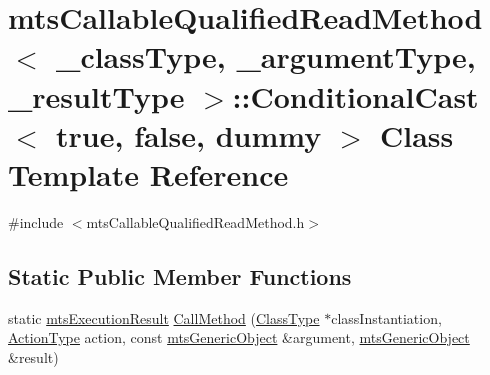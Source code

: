 \hypertarget{classmts_callable_qualified_read_method_1_1_conditional_cast_3_01true_00_01false_00_01dummy_01_4}{\section{mts\-Callable\-Qualified\-Read\-Method$<$ \-\_\-class\-Type, \-\_\-argument\-Type, \-\_\-result\-Type $>$\-:\-:Conditional\-Cast$<$ true, false, dummy $>$ Class Template Reference}
\label{classmts_callable_qualified_read_method_1_1_conditional_cast_3_01true_00_01false_00_01dummy_01_4}
}


{\ttfamily \#include $<$mts\-Callable\-Qualified\-Read\-Method.\-h$>$}

\subsection*{Static Public Member Functions}
\begin{DoxyCompactItemize}
\item 
static \hyperlink{classmts_execution_result}{mts\-Execution\-Result} \hyperlink{classmts_callable_qualified_read_method_1_1_conditional_cast_3_01true_00_01false_00_01dummy_01_4_a961446b0b2cd05bcb2a419fc781f43e8}{Call\-Method} (\hyperlink{classmts_callable_qualified_read_method_a6cfee5c3c3c49c691c2f5176ea79d735}{Class\-Type} $\ast$class\-Instantiation, \hyperlink{classmts_callable_qualified_read_method_ac6fc895837df0b66d84405f3ee01f153}{Action\-Type} action, const \hyperlink{classmts_generic_object}{mts\-Generic\-Object} \&argument, \hyperlink{classmts_generic_object}{mts\-Generic\-Object} \&result)
\end{DoxyCompactItemize}


